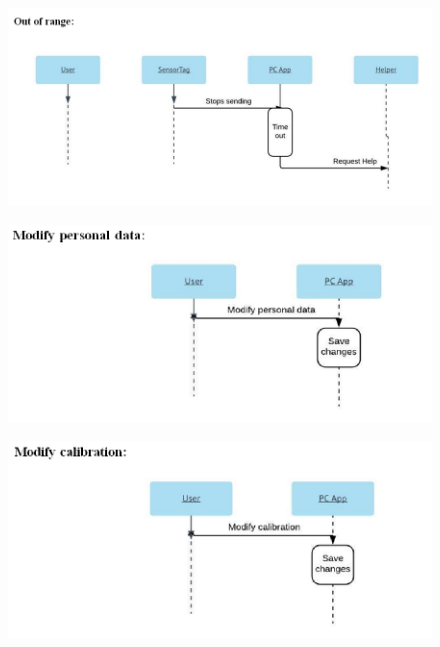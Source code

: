 \documentclass[conference,12pt]{IEEETran}
\begin{document}
\FloatBarrier
\begin{figure}[!h]
	\centering
	\includegraphics[scale=0.4]{images/Seq_OOR.png}
	\label{img:OOR}
\end{figure}
\FloatBarrier

\FloatBarrier
\begin{figure}[!h]
	\centering
	\includegraphics[scale=0.4]{images/Seq_Modify.png}
	\label{img:modpersdata}
\end{figure}
\FloatBarrier

\FloatBarrier
\begin{figure}[!h]
	\centering
	\includegraphics[scale=0.4]{images/Seq_Modify_Cal.png}
	\label{img:modcal}
\end{figure}
\FloatBarrier
\end{document}
